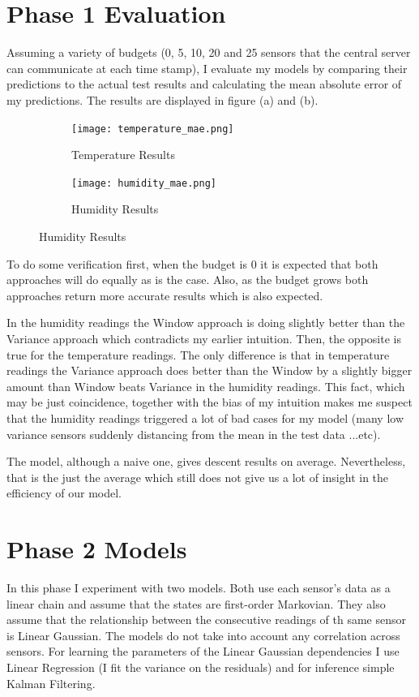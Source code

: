 \documentclass{article}
\begin{document}
\section{Phase 1 Evaluation}

Assuming a variety of budgets (0, 5, 10, 20 and 25
sensors that the central server can communicate at
each time stamp), I evaluate my models by comparing
their predictions to the actual test results and
calculating the mean absolute error of my
predictions. The results are displayed in figure (a)
and (b).

\begin{figure}[h!]
	\begin{subfigure}{\linewidth}
	\texttt{[image: temperature\_mae.png]}
	\caption{Temperature Results}
	\end{subfigure}
	\begin{subfigure}{\linewidth}
	\texttt{[image: humidity\_mae.png]}
	\caption{Humidity Results}
	\end{subfigure}
\end{figure}

\newpage

To do some verification first, when the budget is 0
it is expected that both approaches will do equally
as is the case. Also, as the budget grows both
approaches return more accurate results which is
also expected.

In the humidity readings the Window approach is
doing slightly better than the Variance approach
which contradicts my earlier intuition. Then, the
opposite is true for the temperature readings.
The only difference is that in temperature readings
the Variance approach does better than the Window
by a slightly bigger amount than Window beats Variance
in the humidity readings. This fact, which may
be just coincidence, together with the bias of
my intuition makes me suspect that the humidity
readings triggered a lot of bad cases for my
model (many low variance sensors suddenly distancing
from the mean in the test data ...etc).

The model, although a naive one, gives descent
results on average. Nevertheless, that is the just
the average which still does not give us a lot of
insight in the efficiency of our model.

\section{Phase 2 Models}

In this phase I experiment with two models. Both use
each sensor's data as a linear chain and assume that
the states are first-order Markovian. They also
assume that the relationship between the consecutive
readings of th same sensor is Linear Gaussian. The
models do not take into account any correlation
across sensors. For learning the parameters of the
Linear Gaussian dependencies I use Linear Regression
(I fit the variance on the residuals) and for inference
simple Kalman Filtering.
\end{document}
